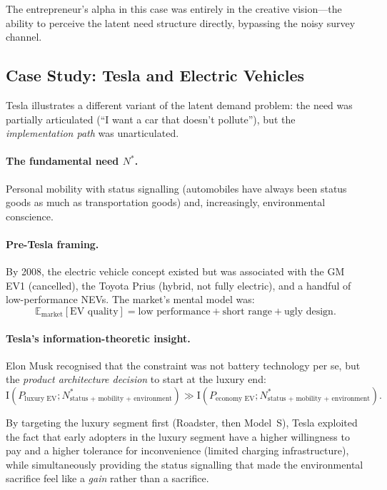 \documentclass[12pt,a4paper,oneside]{book}
\theoremstyle{definition}
\theoremstyle{remark}
\newcommand{\E}{\mathbb{E}}
\newcommand{\MI}{\mathrm{I}}
\begin{document}
The entrepreneur's alpha in this case was entirely in the creative vision---the ability
to perceive the latent need structure directly, bypassing the noisy survey channel.

\subsection{Case Study: Tesla and Electric Vehicles}

Tesla illustrates a different variant of the latent demand problem: the need was
partially articulated (``I want a car that doesn't pollute''), but the
\emph{implementation path} was unarticulated.

\paragraph{The fundamental need $N^*$.} Personal mobility with status signalling
(automobiles have always been status goods as much as transportation goods) and,
increasingly, environmental conscience.

\paragraph{Pre-Tesla framing.} By 2008, the electric vehicle concept existed but was
associated with the GM EV1 (cancelled), the Toyota Prius (hybrid, not fully electric),
and a handful of low-performance NEVs. The market's mental model was:
\begin{equation}
  \E_{\text{market}}[\text{EV quality}] = \text{low performance}
    + \text{short range} + \text{ugly design}.
\end{equation}

\paragraph{Tesla's information-theoretic insight.} Elon Musk recognised that the
constraint was not battery technology per se, but the \emph{product architecture
decision} to start at the luxury end:
\begin{equation}
  \MI(P_{\text{luxury EV}}; N^*_{\text{status + mobility + environment}})
  \gg \MI(P_{\text{economy EV}}; N^*_{\text{status + mobility + environment}}).
\end{equation}

By targeting the luxury segment first (Roadster, then Model~S), Tesla exploited the fact
that early adopters in the luxury segment have a higher willingness to pay and a higher
tolerance for inconvenience (limited charging infrastructure), while simultaneously
providing the status signalling that made the environmental sacrifice feel like a
\emph{gain} rather than a sacrifice.
\end{document}
